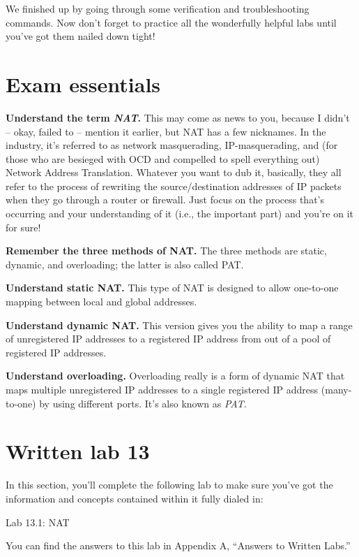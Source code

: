 We finished up by going through some verification and troubleshooting
commands. Now don't forget to practice all the wonderfully helpful labs
until you've got them nailed down tight!



\section{Exam essentials}

\textbf{Understand the term \emph{NAT}.} This may come as news to you,
because I didn't -- okay, failed to -- mention it earlier, but NAT has a
few nicknames. In the industry, it's referred to as network
masquerading, IP-masquerading, and (for those who are besieged with OCD
and compelled to spell everything out) Network Address Translation.
Whatever you want to dub it, basically, they all refer to the process of
rewriting the source/destination addresses of IP packets when they go
through a router or firewall. Just focus on the process that's occurring
and your understanding of it (i.e., the important part) and you're on it
for sure!

\textbf{Remember the three methods of NAT.} The three methods are
static, dynamic, and overloading; the latter is also called PAT.

\textbf{Understand static NAT.} This type of NAT is designed to allow
one-to-one mapping between local and global addresses.

\textbf{Understand dynamic NAT.} This version gives you the ability to
map a range of unregistered IP addresses to a registered IP address from
out of a pool of registered IP addresses.

\textbf{Understand overloading.} Overloading really is a form of dynamic
NAT that maps multiple unregistered IP addresses to a single registered
IP address (many-to-one) by using different ports. It's also known as
\emph{PAT}.



\section{Written lab 13}

In this section, you'll complete the following lab to make sure you've
got the information and concepts contained within it fully dialed in:

Lab 13.1: NAT

You can find the answers to this lab in Appendix A, ``Answers to Written
Labs.''

